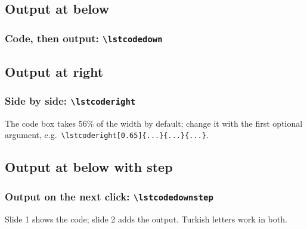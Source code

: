 \documentclass[aspectratio=169,10pt,compress]{beamer}
\begin{document}


\subsection[down]{Output at below}




\begin{frame}[t,fragile] \frametitle{Code, then output: \texttt{\textbackslash lstcodedown}}
\end{frame}





\subsection[right]{Output at right}




\begin{frame}[t,fragile] \frametitle{Side by side: \texttt{\textbackslash lstcoderight}}

  \vspace{0.5em}
  \small The code box takes 56\% of the width by default; change it with the first optional
  argument, e.g.\ \verb|\lstcoderight[0.65]{...}{...}{...}|.
\end{frame}



\subsection[downStep]{Output at below with step}




\begin{frame}[t,fragile] \frametitle{Output on the next click: \texttt{\textbackslash lstcodedownstep}}

  \small Slide 1 shows the code; slide 2 adds the output. Turkish letters work in both.
\end{frame}
\end{document}
